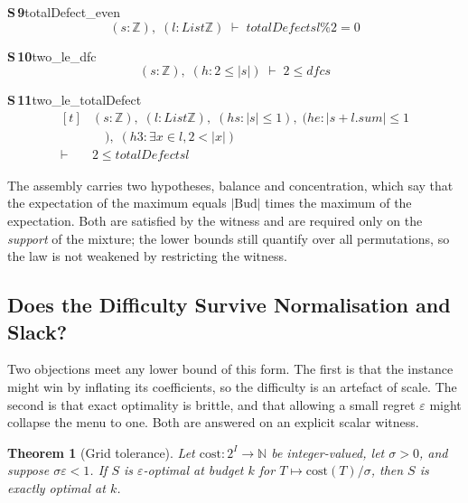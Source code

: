 \documentclass[conference]{IEEEtran}
\newtheorem{theorem}{Theorem}
\theoremstyle{definition}
\newcommand{\lean}[1]{\textsf{\footnotesize #1}}
\begin{document}
\noindent\textbf{S\,9}\quad\lean{totalDefect\_even}
{\footnotesize\[ (\mathit{s} : \mathbb{Z} ),\; (\mathit{l} : \mathit{List} \mathbb{Z} ) \;\vdash\; \mathit{totalDefect} \mathit{s} \mathit{l} \% 2 = 0 \]}

\noindent\textbf{S\,10}\quad\lean{two\_le\_dfc}
{\footnotesize\[ (\mathit{s} : \mathbb{Z} ),\; (\mathit{h} : 2 \leq |\mathit{s}|) \;\vdash\; 2 \leq \mathit{dfc} \mathit{s} \]}

\noindent\textbf{S\,11}\quad\lean{two\_le\_totalDefect}
{\footnotesize\[ \begin{aligned}[t]
&(\mathit{s} : \mathbb{Z} ),\; (\mathit{l} : \mathit{List} \mathbb{Z} ),\; (\mathit{hs} : |\mathit{s}| \leq 1),\; (\mathit{he} : |\mathit{s} + \mathit{l}.\mathit{sum}| \leq 1\\
&\quad ),\; (\mathit{h3} : \exists \mathit{x} \in \mathit{l}, 2 < |\mathit{x}|)\\
\vdash\;&2 \leq \mathit{totalDefect} \mathit{s} \mathit{l}
\end{aligned} \]}


The assembly carries two hypotheses, balance and concentration, which say that the
expectation of the maximum equals $|\mathrm{Bud}|$ times the maximum of the expectation. Both
are satisfied by the witness and are required only on the \emph{support} of the mixture; the
lower bounds still quantify over all permutations, so the law is not weakened by restricting
the witness.

\subsection{Does the Difficulty Survive Normalisation and Slack?}
\label{sec:tolerance}

Two objections meet any lower bound of this form. The first is that the instance might win by
inflating its coefficients, so the difficulty is an artefact of scale. The second is that
exact optimality is brittle, and that allowing a small regret $\varepsilon$ might collapse the
menu to one. Both are answered on an explicit scalar witness.

\begin{theorem}[Grid tolerance]
\label{thm:grid}
Let $\mathrm{cost}:2^{I}\to\mathbb{N}$ be integer-valued, let $\sigma>0$, and suppose
$\sigma\varepsilon<1$. If $S$ is $\varepsilon$-optimal at budget $k$ for
$T\mapsto\mathrm{cost}(T)/\sigma$, then $S$ is \emph{exactly} optimal at $k$.
\end{theorem}
\end{document}

